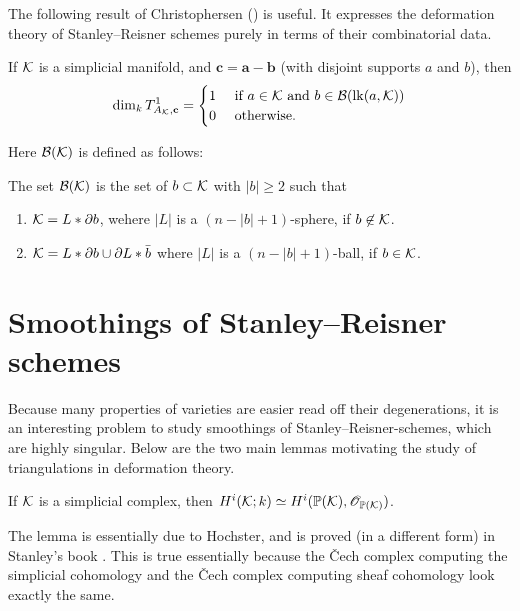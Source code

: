 The following result of Christophersen (\cite[Theorem 4.6]{deforming_christophersen}) is useful. It expresses the deformation theory of Stanley--Reisner schemes purely in terms of their combinatorial data.

\begin{theorem}
\label{thm:t1dims}
If $\mathcal{K}$ is a simplicial manifold, and $\mathbf c = \mathbf a - \mathbf b$ (with disjoint supports $a$ and $b$), then
$$
\dim_k T_{A_{\mathcal{K}},\mathbf c}^1 = \begin{cases}
1 & \text{ if } a  \in \mathcal{K} \text{ and } b \in \mathcal B(\mathrm{lk}(a,\mathcal{K})) \\
0 & \text{ otherwise.}
\end{cases}
$$
\end{theorem}
Here $\mathcal B(\mathcal{K})$ is defined as follows:
\begin{definition}
The set $\mathcal B(\mathcal{K})$ is the set of $b \subset \mathcal{K}$ with $|b| \geq 2$ such that
\begin{enumerate}
	\item $\mathcal{K} = L \ast \partial b$, wehere $|L|$ is a $(n-|b|+1)$-sphere, if $b \not \in \mathcal{K}$.
	\item $\mathcal{K} = L \ast \partial b \cup \partial L \ast \bar{b}$ where $|L|$ is a $(n-|b|+1)$-ball, if $b \in \mathcal{K}$.
\end{enumerate}
\end{definition}

\section{Smoothings of Stanley--Reisner schemes}

Because many properties of varieties are easier read off their degenerations, it is an interesting problem to study smoothings of Stanley--Reisner-schemes, which are highly singular. Below are the two main lemmas motivating the study of triangulations in deformation theory.

\begin{lemma}
\label{lemma:srcohom}
If $\mathcal{K}$ is a simplicial complex, then $H^i(\mathcal{K};k) \simeq H^i(\mathbb{P}(\mathcal{K}),\mathscr{O}_{\mathbb{P}(\mathcal{K})})$.
\end{lemma}
The lemma is essentially due to Hochster, and is proved (in a different form) in Stanley's book \cite{stanley_green}. This is true essentially because the \v{C}ech complex computing the simplicial cohomology and the \v{C}ech complex computing sheaf cohomology look exactly the same.

